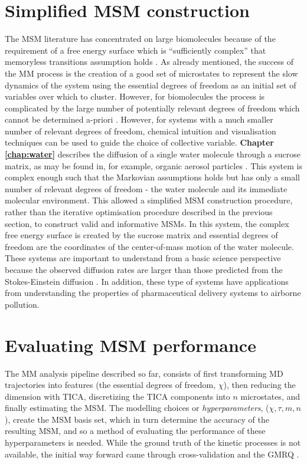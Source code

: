 \section{Simplified MSM construction}
The MSM literature has concentrated on large biomolecules because of the requirement of a free energy surface which is ``sufficiently complex'' that memoryless transitions assumption holds \cite{zwanzigClassicalDynamicsContinuous1983a}. As already mentioned, the success of the MM process is the creation of a good set of microstates to represent the slow dynamics of the system using the essential degrees of freedom as an initial set of variables over which to cluster. However, for biomolecules the process is complicated by the large number of potentially relevant degrees of freedom which cannot be determined a-priori \cite{shallowayMacrostatesClassicalStochastic1996}. However, for systems with a much smaller number of relevant degrees of freedom, chemical intuition and  visualisation techniques can be used to guide the choice of collective variable.
\textbf{Chapter \ref{chap:water}} describes the diffusion of a single water molecule through a sucrose matrix, as may be found in, for example, organic aerosol particles \cite{songTransientCavityDynamics2020a}. This system is complex enough such that the Markovian assumptions holds but has only a small number of relevant degrees of freedom - the water molecule and its immediate molecular environment.  This allowed a simplified MSM construction procedure,  rather than the iterative optimisation procedure described in the previous section, to construct valid and informative MSMs. 
In this system, the complex free energy surface is created by the sucrose matrix and essential degrees of freedom are the coordinates of the center-of-mass motion of the water molecule. These systems are important to understand from a basic science perspective because the observed diffusion rates are larger than those predicted from the Stokes-Einstein diffusion \cite{songTransientCavityDynamics2020a}. In addition, these type of systems have applications from understanding the properties of pharmaceutical delivery systems to airborne pollution. 

\section{Evaluating MSM performance}\label{sec:intro_msm_perf}
The MM analysis pipeline described so far, consists of first transforming MD trajectories into features (the essential degrees of freedom, $\chi$), then reducing the dimension with TICA,  discretizing the TICA components into $n$ microstates, and finally estimating the MSM. The modelling choices or \emph{hyperparameters}, ($\chi, \tau, m, n$), create the MSM basis set, which in turn determine the accuracy of the resulting MSM, and so a method of evaluating the performance of these hyperparameters  is needed. While the ground truth of the kinetic processes is not available, the initial way forward came through cross-validation and the GMRQ \cite{mcgibbonVariationalCrossvalidationSlow2015}. 

